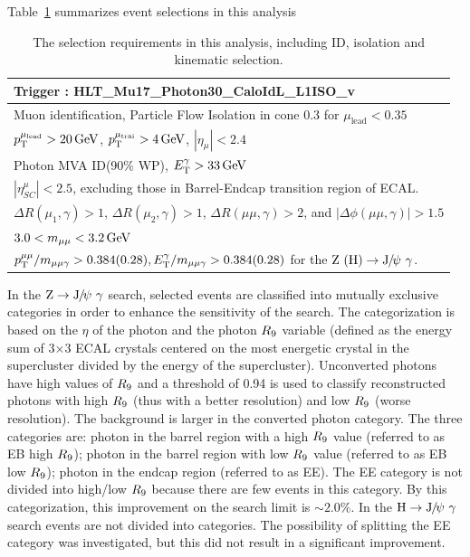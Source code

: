 		Table~\ref{tab:FullSelec} summarizes event selections in this analysis
		\begin{table}[!ht]
		    \begin{center}
		    \begin{tabular}{l}
		      \hline
		      Trigger : HLT\_Mu17\_Photon30\_CaloIdL\_L1ISO\_v\* \\
		      \hline
		      Muon identification,  Particle Flow Isolation in cone 0.3 for $\mu_{\text{lead}} < 0.35$\\ 
		      $p_{\mathrm{T}}^{\mu_{\text{lead}}} > 20\,\text{Ge\hspace{-.08em}V}$, $p_{\mathrm{T}}^{\mu_{\text{trai}}} > 4\,\text{Ge\hspace{-.08em}V}$, $|\eta_{\mu}| < 2.4$ \\
		      \hline
		      Photon MVA ID(90$\%$ WP), $E_{\mathrm{T}}^{\gamma} > 33\,\text{Ge\hspace{-.08em}V}$ \\
		      $|\eta_{SC}^{\mu}| < 2.5$, excluding those in Barrel-Endcap transition region of ECAL.\\
		      \hline
		      $\Delta R(\mu_{1},\gamma) > 1$, $\Delta R(\mu_{2},\gamma) > 1$, $\Delta R(\mu\mu,\gamma) > 2$, and $|\Delta\phi(\mu\mu,\gamma)| > 1.5$ \\
		      \hline
		      $3.0 < m_{\mu\mu} < 3.2\,\text{Ge\hspace{-.08em}V}$ \\
		      \hline
		      $p_{\mathrm{T}}^{\mu\mu} / m_{\mu\mu\gamma} >  0.384 (0.28), E_{\mathrm{T}}^{\gamma} / m_{\mu\mu\gamma} > 0.384  (0.28)$ for the $\cPZ\ (\PH)\to\JPsi\ \gamma$. \\
		      \hline
		    \end{tabular}
		    \caption{The selection requirements in this analysis, including ID, isolation and kinematic selection.\label{tab:FullSelec}}
		    \end{center}
		\end{table}
		
	In the $\mathrm{Z}\to{\mathrm{J}\hspace{-.08em}/\hspace{-.14em}\psi}\ \gamma$ search, selected events are classified into mutually exclusive categories in order to enhance the sensitivity of the search. The categorization is based on the $\eta$ of the photon and the photon $R_\mathrm{9}$ variable (defined as the energy sum of 3$\times$3 ECAL crystals centered on the most energetic crystal in the supercluster divided by the energy of the supercluster). Unconverted photons have high values of $R_\mathrm{9}$ and a threshold of 0.94 is used to classify reconstructed photons with high $R_\mathrm{9}$ (thus with a better resolution) and low $R_\mathrm{9}$ (worse resolution).  The background is larger in the converted photon category.  The three categories are: photon in the barrel region with a high $R_\mathrm{9}$ value (referred to as EB high $R_\mathrm{9}$); photon in the barrel region with low $R_\mathrm{9}$ value (referred to as EB low $R_\mathrm{9}$); photon in the endcap region (referred to as EE). The EE category is not divided into high/low $R_\mathrm{9}$ because there are few events in this category. By this categorization, this improvement on the search limit is $\sim 2.0\%$.
	In the $\mathrm{H}\to{\mathrm{J}\hspace{-.08em}/\hspace{-.14em}\psi}\ \gamma$ search events are not divided into categories. The possibility of splitting the EE category was investigated, but this did not result in a significant improvement.	
		
